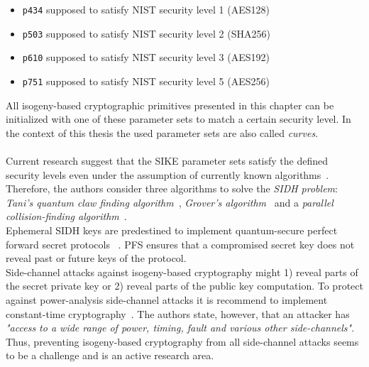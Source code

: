 \begin{itemize}
\itemsep0em 
	\item \texttt{p434} supposed to satisfy \gls{NIST} security level 1 (AES128)
	\item \texttt{p503} supposed to satisfy \gls{NIST} security level 2 (SHA256)
	\item \texttt{p610} supposed to satisfy \gls{NIST} security level 3 (AES192)
	\item \texttt{p751} supposed to satisfy \gls{NIST} security level 5 (AES256)
\end{itemize}
All isogeny-based cryptographic primitives presented in this chapter can be initialized with one of these parameter sets to match a certain security level. In the context of this thesis the used parameter sets are also called \textit{curves}.
\\\\
Current research suggest that the \gls{SIKE} parameter sets satisfy the defined security levels even under the assumption of currently known algorithms~\parencite{jaques2019quantum}. Therefore, the authors consider three algorithms to solve the \textit{\gls{SIDH} problem}: \textit{Tani's quantum claw finding algorithm}~\parencite{tani2009claw}, \textit{Grover's algorithm}~\parencite{grover1996fast} and a \textit{parallel collision-finding algorithm}~\parencite{van1999parallel}.
\\
Ephemeral \gls{SIDH} keys are predestined to implement quantum-secure perfect forward secret protocols ~\parencite{koziel2018high}. \gls{PFS} ensures that a compromised secret key does not reveal past or future keys of the protocol.
\\
Side-channel attacks against isogeny-based cryptography might 1) reveal parts of the secret private key or 2) reveal parts of the public key computation. To protect against power-analysis side-channel attacks it is recommend to implement constant-time cryptography~\parencite{sike2020spec}. The authors state, however, that an attacker has \textit{"access to a wide range of power, timing, fault and various other side-channels"}. Thus, preventing isogeny-based cryptography from all side-channel attacks seems to be a challenge and is an active research area.
